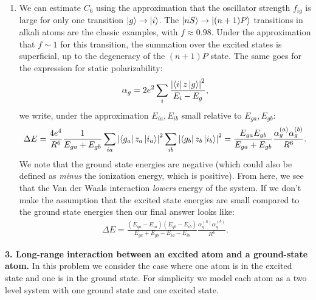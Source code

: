 \documentclass{article}
\theoremstyle{definition}
\newcommand{\al}{\alpha}
\newcommand{\f}[2]{\frac{#1}{#2}}
\begin{document}
\begin{enumerate}[label=(\alph*)]
\item We can estimate $C_6$ using the approximation that the oscillator strength $f_{ig}$ is large for only one transition $\ket{g} \to \ket{i}$. The $\ket{nS} \to \ket{(n+1)P}$ transitions in alkali atoms are the classic examples, with $f \approx 0.98$. Under the approximation that $f\sim 1$ for this transition, the summation over the excited states is superficial, up to the degeneracy of the $(n+1)P$ state. The same goes for the expression for  static polarizability:
\begin{align*}
\al_g = 2e^2 \sum_i \f{\abs{ \bra{i}z \ket{g} }^2}{E_i - E_g},
\end{align*}
we write, under the approximation $E_{ia}, E_{ib}$ small relative to $E_{ga}, E_{gb}$:
\begin{align*}
\Delta E 
= 
\f{ 4e^4 }{R^6} \f{1}{E_{ga} + E_{gb}} 
\sum_{ia} \abs{ \bra{g_a} z_a \ket{i_a}}^2   \sum_{ib} \abs{ \bra{g_b} z_b \ket{i_b}}^2 
=  \f{E_{ga}E_{gb}}{E_{ga} + E_{gb}} 
\f{\al_g^{(a)} \al_g^{(b)}}{R^6}.
\end{align*}
We note that the ground state energies are negative (which could also be defined as \textit{minus} the ionization energy, which is positive). From here, we see that the Van der Waals interaction \textit{lowers} energy of the system. If we don't make the assumption that the excited state energies are small compared to the ground state energies then our final answer looks like:
\begin{align*}
\Delta E = \f{(E_{ga} - E_{ia})(E_{gb} - E_{ib})}{E_{ga} + E_{gb} - E_{ia} - E_{ib}}   
\f{\al_g^{(a)} \al_g^{(b)}}{R^6}.
\end{align*}



\end{enumerate}



\noindent \textbf{3. Long-range interaction between an excited atom and a ground-state atom.} In this problem we consider the case where one atom is in the excited state and one is in the ground state. For simplicity we model each atom as a two level system with one ground state and one excited state. 
\end{document}
